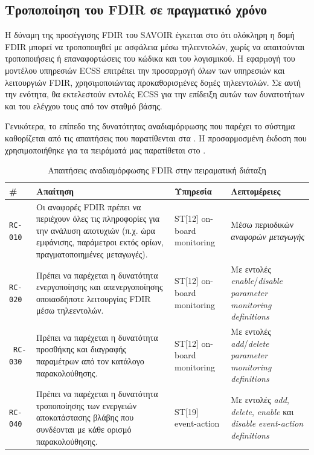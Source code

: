 \documentclass[a4paper,nobib]{tufte-book}
\begin{document}
\clearpage
\subsection{Τροποποίηση του \acs{FDIR} σε πραγματικό χρόνο}

Η δύναμη της προσέγγισης \ac{FDIR} του \acs{SAVOIR} έγκειται στο ότι ολόκληρη η δομή \ac{FDIR} μπορεί να τροποποιηθεί με ασφάλεια μέσω τηλεεντολών, χωρίς να απαιτούνται τροποποιήσεις ή επαναφορτώσεις του κώδικα και του λογισμικού. Η εφαρµογή του μοντέλου υπηρεσιών \acs{ECSS} επιτρέπει την προσαρµογή όλων των υπηρεσιών και λειτουργιών \ac{FDIR}, χρησιµοποιώντας προκαθορισµένες δοµές τηλεεντολών. Σε αυτή την ενότητα, θα εκτελεστούν εντολές \acs{ECSS} για την επίδειξη αυτών των δυνατοτήτων και του ελέγχου τους από τον σταθμό βάσης.

Γενικότερα, το επίπεδο της δυνατότητας αναδιαμόρφωσης που παρέχει το σύστημα καθορίζεται από τις απαιτήσεις που παρατίθενται στα \cite{ECSS-E-ST-70-11C,SAVOIR-HB-003}. Η προσαρμοσμένη έκδοση που χρησιμοποιήθηκε για τα πειράματά μας παρατίθεται στο .

\begin{table}[h]
	\centering
	\caption{Απαιτήσεις αναδιαμόρφωσης \ac{FDIR} στην πειραματική διάταξη}
	\label{tab:fdir-recon-rq}
	\begin{tabularx}{\textwidth}{@{}lXlL{4cm}@{}}
		\toprule
		\# & Απαίτηση & Υπηρεσία & Λεπτομέρειες \\ \midrule
		\texttt{RC-010} & Οι αναφορές FDIR πρέπει να περιέχουν όλες τις πληροφορίες για την ανάλυση αποτυχιών (π.χ. ώρα εμφάνισης, παράμετροι εκτός ορίων, πραγματοποιημένες μεταγωγές). & ST[12] on-board monitoring & Μέσω περιοδικών \emph{αναφορών μεταγωγής} \\
		\texttt{RC-020} & Πρέπει να παρέχεται η δυνατότητα ενεργοποίησης και απενεργοποίησης οποιασδήποτε λειτουργίας FDIR μέσω τηλεεντολών. & ST[12] on-board monitoring & Με εντολές \emph{enable}/\emph{disable} \emph{parameter monitoring definitions} \\\
		\texttt{RC-030} & Πρέπει να παρέχεται η δυνατότητα προσθήκης και διαγραφής παραμέτρων από τον κατάλογο παρακολούθησης. & ST[12] on-board monitoring & Με εντολές \emph{add}/\emph{delete} \emph{parameter monitoring definitions} \\
		\texttt{RC-040} & Πρέπει να παρέχεται η δυνατότητα τροποποίησης των ενεργειών αποκατάστασης βλάβης που συνδέονται με κάθε ορισμό παρακολούθησης. & ST[19] event-action & Με εντολές \emph{add}, \emph{delete}, \emph{enable} και \emph{disable} \emph{event-action definitions} \\ \bottomrule
	\end{tabularx}
\end{table}
\end{document}
